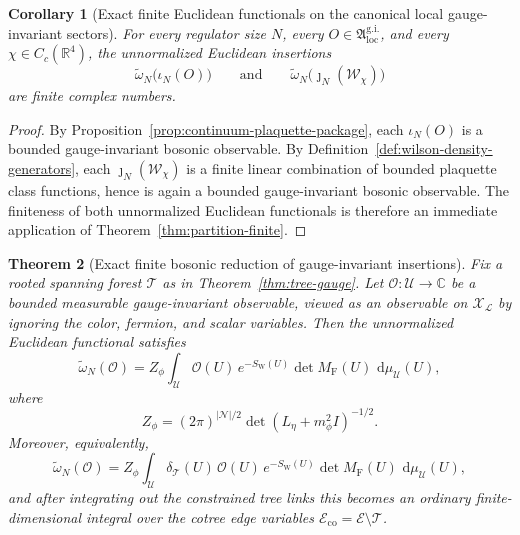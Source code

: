 \documentclass[11pt]{article}
\newtheorem{theorem}{Theorem}[section]
\newtheorem{corollary}[theorem]{Corollary}
\theoremstyle{remark}
\newcommand{\R}{\mathbb R}
\newcommand{\C}{\mathbb C}
\newcommand{\mcN}{\mathcal N}
\newcommand{\mcE}{\mathcal E}
\newcommand{\mcT}{\mathcal T}
\newcommand{\mcU}{\mathscr U}
\newcommand{\mcX}{\mathscr X}
\newcommand{\mcO}{\mathcal O}
\newcommand{\dd}{\,\mathrm d}
\begin{document}
\begin{corollary}[Exact finite Euclidean functionals on the canonical local gauge-invariant sectors]
\label{cor:finite-euclidean-local-sectors}
For every regulator size \(N\), every
\(O\in\mathfrak A_{\mathrm{loc}}^{\mathrm{g.i.}}\), and every
\(\chi\in C_c(\R^4)\), the unnormalized Euclidean insertions
\[
\widetilde\omega_N\bigl(\iota_N(O)\bigr)
\qquad\text{and}\qquad
\widetilde\omega_N\bigl(\jmath_N(\mathcal W_\chi)\bigr)
\]
are finite complex numbers.
\end{corollary}

\begin{proof}
By Proposition~\ref{prop:continuum-plaquette-package}, each
\(\iota_N(O)\) is a bounded gauge-invariant bosonic observable.  By
Definition~\ref{def:wilson-density-generators}, each
\(\jmath_N(\mathcal W_\chi)\) is a finite linear combination of bounded
plaquette class functions, hence is again a bounded gauge-invariant bosonic
observable.  The finiteness of both unnormalized Euclidean functionals is
therefore an immediate application of Theorem~\ref{thm:partition-finite}.
\end{proof}

\begin{theorem}[Exact finite bosonic reduction of gauge-invariant insertions]
\label{thm:bosonic-reduction}
Fix a rooted spanning forest \(\mcT\) as in
Theorem~\ref{thm:tree-gauge}.  Let \(\mcO:\mcU\to\C\) be a bounded measurable
gauge-invariant observable, viewed as an observable on
\(\mcX_{\mathcal L}\) by ignoring the color, fermion, and scalar variables.
Then the unnormalized Euclidean functional satisfies
\[
\widetilde\omega_N(\mcO)
=
Z_\phi
\int_{\mcU}
\mcO(U)\,e^{-S_{\mathrm W}(U)}\det M_{\mathrm F}(U)\,
\dd\mu_{\mcU}(U),
\]
where
\[
Z_\phi=(2\pi)^{|\mcN|/2}\det(L_\eta+m_\phi^2 I)^{-1/2}.
\]
Moreover, equivalently,
\[
\widetilde\omega_N(\mcO)
=
Z_\phi
\int_{\mcU}
\delta_{\mcT}(U)\,\mcO(U)\,e^{-S_{\mathrm W}(U)}\det M_{\mathrm F}(U)\,
\dd\mu_{\mcU}(U),
\]
and after integrating out the constrained tree links this becomes an ordinary
finite-dimensional integral over the cotree edge variables
\(\mcE_{\mathrm{co}}=\mcE\setminus\mcT\).
\end{theorem}
\end{document}
